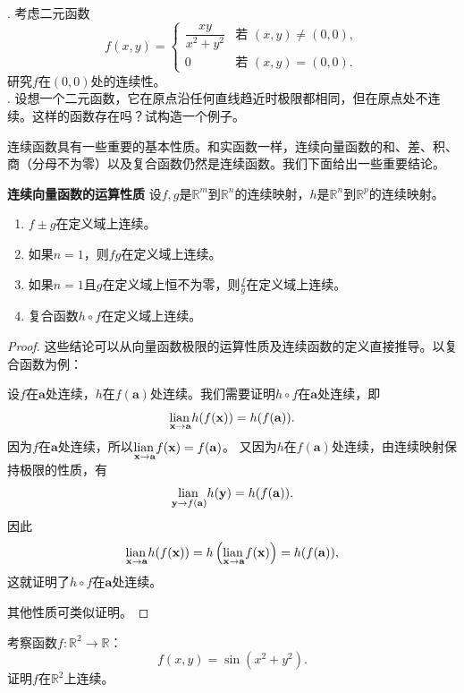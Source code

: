 \documentclass[12pt,UTF8]{ctexbook}
\begin{document}
\begin{sk}
\mbox{}\\
. 考虑二元函数
$$ f(x, y) = \begin{cases}
\dfrac{xy}{x^2+y^2} & \text{若 } (x, y) \neq (0, 0), \\
0 & \text{若 } (x, y) = (0, 0).
\end{cases} $$
研究$f$在$(0, 0)$处的连续性。\\
. 设想一个二元函数，它在原点沿任何直线趋近时极限都相同，但在原点处不连续。这样的函数存在吗？试构造一个例子。
\end{sk}

连续函数具有一些重要的基本性质。和实函数一样，连续向量函数的和、差、积、商（分母不为零）以及复合函数仍然是连续函数。我们下面给出一些重要结论。

\begin{tm}{\textbf{连续向量函数的运算性质}}
设$f, g$是$\mathbb{R}^m$到$\mathbb{R}^n$的连续映射，$h$是$\mathbb{R}^n$到$\mathbb{R}^p$的连续映射。
\begin{enumerate}[label=\arabic*.]
\item $f \pm g$在定义域上连续。
\item 如果$n=1$，则$fg$在定义域上连续。
\item 如果$n=1$且$g$在定义域上恒不为零，则$\frac{f}{g}$在定义域上连续。
\item 复合函数$h \circ f$在定义域上连续。
\end{enumerate}
\end{tm}

\begin{proof}
这些结论可以从向量函数极限的运算性质及连续函数的定义直接推导。以复合函数为例：

设$f$在$\mathbf{a}$处连续，$h$在$f(\mathbf{a})$处连续。我们需要证明$h \circ f$在$\mathbf{a}$处连续，即
$$ \underset{\mathbf{x}\to \mathbf{a}}{\operatorname{lian}\,} h(f(\mathbf{x})) = h(f(\mathbf{a})). $$
因为$f$在$\mathbf{a}$处连续，所以$\underset{\mathbf{x}\to \mathbf{a}}{\operatorname{lian}\,} f(\mathbf{x}) = f(\mathbf{a})$。
又因为$h$在$f(\mathbf{a})$处连续，由连续映射保持极限的性质，有
$$ \underset{\mathbf{y}\to f(\mathbf{a})}{\operatorname{lian}\,} h(\mathbf{y}) = h(f(\mathbf{a})). $$
因此
$$ \underset{\mathbf{x}\to \mathbf{a}}{\operatorname{lian}\,} h(f(\mathbf{x})) = h\left(\underset{\mathbf{x}\to \mathbf{a}}{\operatorname{lian}\,} f(\mathbf{x})\right) = h(f(\mathbf{a})), $$
这就证明了$h \circ f$在$\mathbf{a}$处连续。

其他性质可类似证明。
\end{proof}

\begin{et}
考察函数$f: \mathbb{R}^2 \to \mathbb{R}$：
$$ f(x, y) = \sin(x^2 + y^2). $$
证明$f$在$\mathbb{R}^2$上连续。
\end{et}
\end{document}
